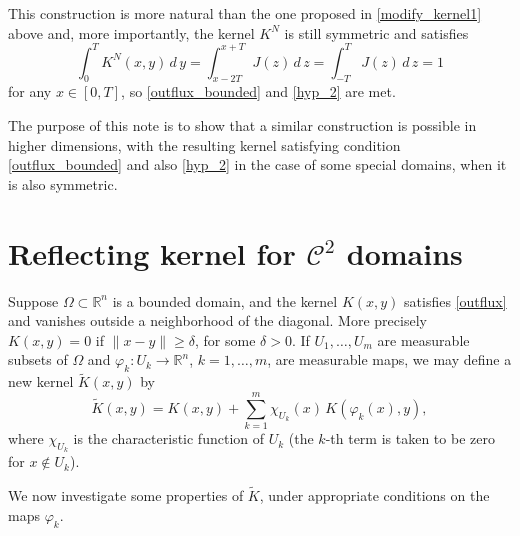 \documentclass[a4paper,12pt]{amsart}
\newcommand{\R}{\mathbb{R}}
\begin{document}
   This construction is more natural than the one proposed in
   \eqref{modify_kernel1} above and, more importantly, the   kernel $K^N$
     is still symmetric
     and satisfies
 \begin{equation*}  \int_{0}^T K^N (x,y) \, d\,y = {\int_{x-2T}^{x+T} J (z) \, d\,z =} \int_{-T}^T J (z) \, d\,z =  1
    \end{equation*}
    for any $x \in [0,T]$, so \eqref{outflux_bounded} and \eqref{hyp_2} are met.

  The purpose of this note is to  show that   a similar construction is possible in higher dimensions, with the   resulting kernel satisfying condition \eqref{outflux_bounded}  and also \eqref{hyp_2} in the case of some special domains, when  it is also symmetric.

\section{Reflecting kernel for $\mathcal{C}^2$ domains}

      Suppose $\Omega \subset \R^n$ is a bounded domain, and the {kernel $K(x,y) $ } {satisfies \eqref{outflux} and} vanishes outside a neighborhood of the diagonal. More precisely  $K(x,y) = 0$ if $\| x-y \| {\geq} \delta $, for some $\delta>0$.
 {If $U_1, \dots, U_m$ are measurable subsets of $\Omega$ and $\varphi_k : U_k \to \R^n$, $k=1,\dots,m$, are measurable maps,}
we may define a new kernel $\tilde{K}(x,y)$ by
     \begin{equation} \label{modf_kernel1}
     \tilde{K}(x,y) = K(x,y) + {\sum_{k=1}^{m} \chi_{U_k}(x)\, K(\varphi_{k}(x),y)},
\end{equation}
{where $\chi_{U_k}$ is the characteristic function of $U_k$ (the $k$-th term is taken to be zero for $x \notin U_k$).}

We now investigate some properties of $ \tilde{K}$, under appropriate conditions on  the maps  $\varphi_k$.
\end{document}
